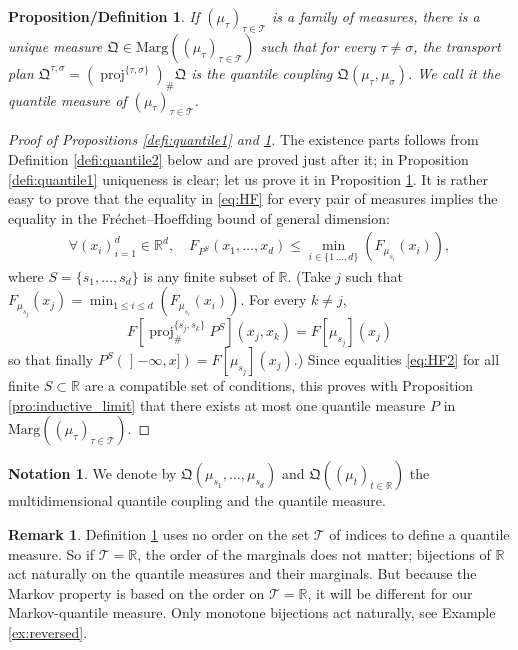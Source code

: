 \documentclass[JEP,XML,SOM,Unicode,NoEqCountersInSection,NoFloatCountersInSection,published]{cedram}
\theoremstyle{plain}
\newtheorem{prodefinition}[them]{Proposition/Definition}
\theoremstyle{definition}
\newtheorem{notation}[them]{Notation} %
\newtheorem{rem}[them]{Remark}
\newcommand{\como}{\mathfrak{Q}}
\newcommand{\Tt}{{\mathcal T}}
\newcommand{\ma}{\mathrm{Marg}}
\newcommand{\R}{\mathbb{R}}
\newcommand{\pr}{\operatorname{proj}}
\newcommand{\op}{\mathopen}
\begin{document}
\begin{prodefinition}\label{defi:quantile_process}If $(\mu_\tau)_{\tau\in\Tt}$ is a family of measures, there is a unique measure $\como\in \ma((\mu_{\tau})_{\tau\in\Tt})$ such that for every $\tau\neq\sigma$, the transport plan $\como^{\tau,\sigma}=(\pr^{\{\tau,\sigma\}})_\#\como$ is the quantile coupling $\como(\mu_\tau,\mu_\sigma)$. We call it the \emph{quantile measure} of $(\mu_\tau)_{\tau\in\Tt}$.
\end{prodefinition}

\begin{proof}[Proof of Propositions \ref{defi:quantile1} and \ref{defi:quantile_process}] The existence parts follows from Definition \ref{defi:quantile2} below and are proved just after it; in Proposition \ref{defi:quantile1} uniqueness is clear; let us prove it in Proposition \ref{defi:quantile_process}. It is rather easy to prove that the equality in \eqref{eq:HF} for every pair of measures implies the equality in the Fréchet--Hoeffding bound of general dimension:
\begin{align}\label{eq:HF2}
\forall(x_i)_{i=1}^d\in\R^d,\quad F_{P^S}(x_1,\ldots,x_d)\leq \min_{i\in\{1\,\ldots,d\}}(F_{\mu_{s_i}}(x_i)),
\end{align}
where $S=\{s_1,\ldots,s_d\}$ is any finite subset of $\R$. (Take $j$ such that $F_{\mu_{s_j}}(x_j)=\min_{1\leq i\leq d}(F_{\mu_{s_i}}(x_i))$. For every $k\neq j$,
\[
F[\pr^{\{s_j,s_k\}}_\#P^S](x_j,x_k)=F[\mu_{s_j}](x_j)
\]
so that finally $P^S(\op]-\infty,x])=F[\mu_{s_j}](x_j)$.) Since equalities \eqref{eq:HF2} for all finite $S\subset\R$ are a compatible set of conditions, this proves with Proposition \ref{pro:inductive_limit} that there exists at most one quantile measure $P$ in $\ma((\mu_\tau)_{\tau\in\Tt})$.
\end{proof}

\begin{notation}\label{not:multi} We denote by $\como(\mu_{s_1},\ldots,\mu_{s_d})$ and $\como((\mu_t)_{t\in \R})$ the multidimensional quantile coupling and the quantile measure.
\end{notation}

\begin{rem}
Definition \ref{defi:quantile_process} uses no order on the set $\Tt$ of indices to define a quantile measure. So if $\Tt=\R$, the order of the marginals does not matter; bijections of $\R$ act naturally on the quantile measures and their marginals. But because the Markov property is based on the order on $\Tt=\R$, it will be different for our Markov-quantile measure. Only monotone bijections act naturally, see Example \ref{ex:reversed}.
\end{rem}
\end{document}
